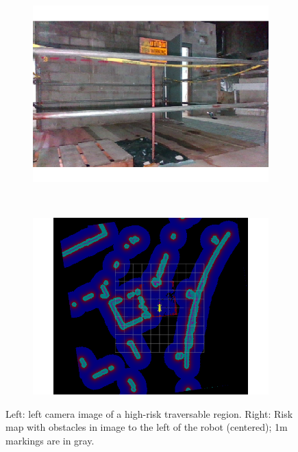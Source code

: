 \documentclass[letterpaper, 10 pt, conference]{ieeeconf}  %
\begin{document}
\begin{figure}[thpb]
   \centering
    \begin{subfigure}{0.5\linewidth}
        \centering
        \includegraphics[trim={1cm 1cm 0cm 1cm},clip, width=\linewidth]{figs/costmap_image.png}
    \end{subfigure}%
    ~ 
    \begin{subfigure}{0.5\linewidth}
        \centering
        \includegraphics[trim={1cm 1cm 1cm 2cm},clip,width=\linewidth]{figs/costmap_large.png}
    \end{subfigure}
    \caption{Left: left camera image of a high-risk traversable region.  Right:  Risk map with obstacles in image to the left of the robot (centered); 1m markings are in gray.}
    \label{global_costmap}
\end{figure}
\end{document}
